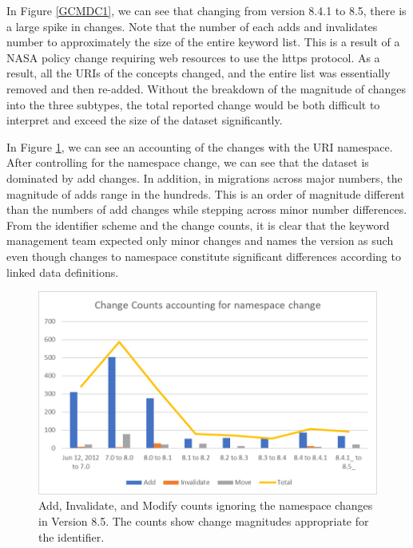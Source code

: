 In Figure \ref{GCMDC1}, we can see that changing from version 8.4.1 to 8.5, there is a large spike in changes.  Note that the number of each adds and invalidates number to approximately the size of the entire keyword list.  This is a result of a NASA policy change requiring web resources to use the https protocol.  As a result, all the URIs of the concepts changed, and the entire list was essentially removed and then re-added.  Without the breakdown of the magnitude of changes into the three subtypes, the total reported change would be both difficult to interpret and exceed the size of the dataset significantly.

In Figure \ref{GCMDC2}, we can see an accounting of the changes with the URI namespace.  After controlling for the namespace change, we can see that the dataset is dominated by add changes.  In addition, in migrations across major numbers, the magnitude of adds range in the hundreds.  This is an order of magnitude different than the numbers of add changes while stepping across minor number differences.  From the identifier scheme and the change counts, it is clear that the keyword management team expected only minor changes and names the version as such even though changes to namespace constitute significant differences according to linked data definitions.

\begin{figure}%
	\centering
	\includegraphics[scale=1]{figures/GCMDChart2.png}
	\caption{Add, Invalidate, and Modify counts ignoring the namespace changes in Version 8.5.  The counts show change magnitudes appropriate for the identifier.}
	\label{GCMDC2}
\end{figure}
